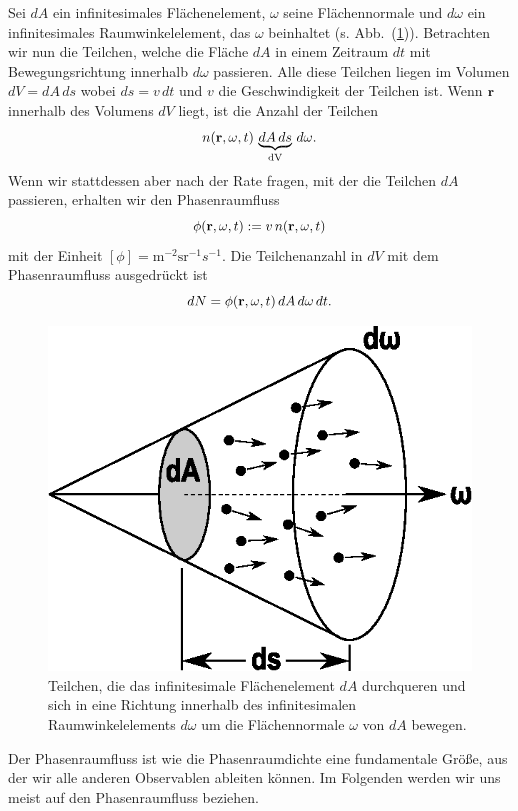 	Sei $dA$ ein infinitesimales Flächenelement, $\omega$ seine Flächennormale und $d\omega$ ein infinitesimales Raumwinkelelement, das $\omega$ beinhaltet (s. Abb.~(\ref{fig:phasespacefluxsurface})). Betrachten wir nun die Teilchen, welche die Fläche $dA$ in einem Zeitraum $dt$ mit Bewegungsrichtung innerhalb $d\omega$ passieren. Alle diese Teilchen liegen im Volumen $dV=dA\,ds$ wobei $ds=v\,dt$ und $v$ die Geschwindigkeit der Teilchen ist. Wenn $\mathbf{r}$ innerhalb des Volumens $dV$ liegt, ist die Anzahl der Teilchen $$n(\mathbf{r},\omega,t)\,\underbrace{dA\,ds}_\text{dV}\,d\omega.$$ Wenn wir stattdessen aber nach der Rate fragen, mit der die Teilchen $dA$ passieren, erhalten wir den Phasenraumfluss $$\phi(\mathbf{r},\omega,t):=v\,n(\mathbf{r},\omega,t)$$ mit der Einheit $[\phi]=\text{m}^{-2}\text{sr}^{-1}s^{-1}$. Die Teilchenanzahl in $dV$ mit dem Phasenraumfluss ausgedrückt ist $$dN=\phi(\mathbf{r},\omega,t)\,dA\,d\omega\,dt.$$
	\begin{figure}
		\centering
		\includegraphics[height=0.3\textheight]{phasespacefluxsurface.eps}
		\caption{Teilchen, die das infinitesimale Flächenelement $dA$ durchqueren und sich in eine Richtung innerhalb des infinitesimalen Raumwinkelelements $d\omega$ um die Flächennormale $\omega$ von $dA$ bewegen.}
		\label{fig:phasespacefluxsurface}
	\end{figure}
	Der Phasenraumfluss ist wie die Phasenraumdichte eine fundamentale Größe, aus der wir alle anderen Observablen ableiten können. Im Folgenden werden wir uns meist auf den Phasenraumfluss beziehen.
		
